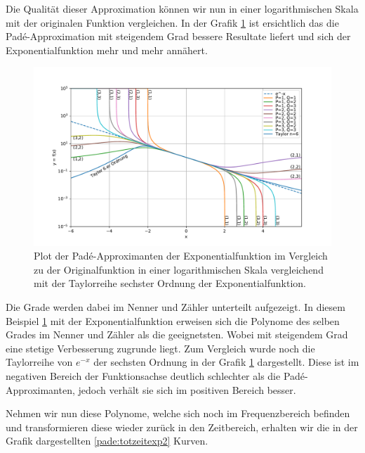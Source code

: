 Die Qualität dieser Approximation können wir nun in einer logarithmischen Skala mit der originalen Funktion vergleichen.
In der Grafik \ref{pade:totzeitexp} ist ersichtlich das die Padé-Approximation mit steigendem Grad bessere Resultate liefert und sich der Exponentialfunktion mehr und mehr annähert.

\begin{figure}[!h]
	\centering
	\includegraphics[width=1\linewidth]{./papers/pade/python/bilder/totzeit.pdf}
	\caption{Plot der Padé-Approximanten der Exponentialfunktion im Vergleich zu der Originalfunktion in einer logarithmischen Skala vergleichend mit der Taylorreihe sechster Ordnung der Exponentialfunktion.\label{pade:totzeitexp}}
\end{figure}

Die Grade werden dabei im Nenner und Zähler unterteilt aufgezeigt.
In diesem Beispiel \ref{pade:totzeitexp} mit der Exponentialfunktion erweisen sich die Polynome des selben Grades im Nenner und Zähler als die geeignetsten.
Wobei mit steigendem Grad eine stetige Verbesserung zugrunde liegt.
Zum Vergleich wurde noch die Taylorreihe von $e^{-x}$ der sechsten Ordnung in der Grafik \ref{pade:totzeitexp} dargestellt. 
Diese ist im negativen Bereich der Funktionsachse deutlich schlechter als die Padé-Approximanten, jedoch verhält sie sich im positiven Bereich besser.


Nehmen wir nun diese Polynome, welche sich noch im Frequenzbereich befinden und transformieren diese wieder zurück in den Zeitbereich, erhalten wir die in der Grafik dargestellten \ref{pade:totzeitexp2} Kurven.

